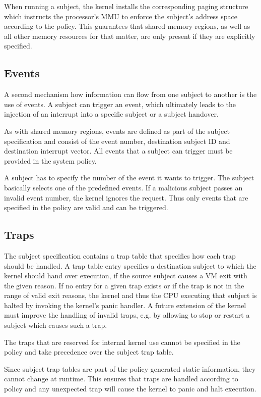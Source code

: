 When running a subject, the kernel installs the corresponding paging structure
which instructs the processor's MMU to enforce the subject's address space
according to the policy. This guarantees that shared memory regions, as well as
all other memory resources for that matter, are only present if they are
explicitly specified.

\subsection{Events}
A second mechanism how information can flow from one subject to another is the
use of events. A subject can trigger an event, which ultimately leads to the
injection of an interrupt into a specific subject or a subject handover.

As with shared memory regions, events are defined as part of the subject
specification and consist of the event number, destination subject ID and
destination interrupt vector. All events that a subject can trigger must be
provided in the system policy.

A subject has to specify the number of the event it wants to trigger. The
subject basically selects one of the predefined events. If a malicious subject
passes an invalid event number, the kernel ignores the request. Thus only events
that are specified in the policy are valid and can be triggered.

\subsection{Traps}
The subject specification contains a trap table that specifies how each trap
should be handled. A trap table entry specifies a destination subject to which
the kernel should hand over execution, if the source subject causes a VM exit
with the given reason. If no entry for a given trap exists or if the trap is not
in the range of valid exit reasons, the kernel and thus the CPU executing that
subject is halted by invoking the kernel's panic handler. A future extension of
the kernel must improve the handling of invalid traps, e.g. by allowing to
stop or restart a subject which causes such a trap.

The traps that are reserved for internal kernel use cannot be specified in the
policy and take precedence over the subject trap table.

Since subject trap tables are part of the policy generated static information,
they cannot change at runtime. This ensures that traps are handled according to
policy and any unexpected trap will cause the kernel to panic and halt
execution.

